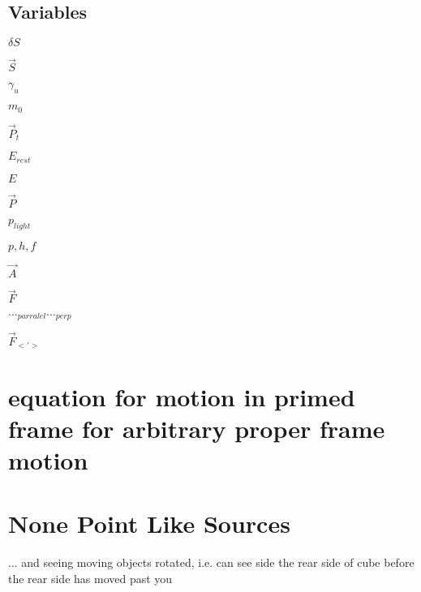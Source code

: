 \section{Variables}

$\delta S$ \newline

$\vec{S}$ \newline

$\gamma_u$ \newline

$m_0$ \newline

$\vec{P}_t$ \newline

$E_{rest}$ \newline

$E$ \newline

$\vec{P}$ \newline

$p_{light}$ \newline

$p, h, f$ \newline

$\vec{A}$ \newline

$\vec{F}$ \newline

$..._{parralel} ..._{perp}$ \newline

$\vec{F}_{<'>}$ \newline



\chapter{equation for motion in primed frame for arbitrary proper frame motion}

\chapter{None Point Like Sources}
... and seeing moving objects rotated, i.e. can see side the rear side of cube before the rear side has moved past you
